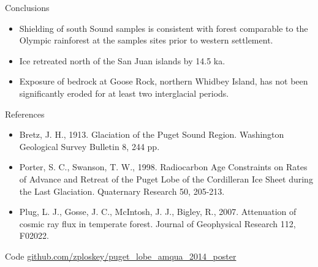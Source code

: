\documentclass{beamer}
\begin{document}
\begin{frame}{}
\begin{columns}[T]
\begin{column}{.32\columnwidth}
\begin{block}{Conclusions}
\begin{itemize}
\item Shielding of south Sound samples is consistent with forest comparable to the Olympic rainforest at the samples sites prior to western settlement.
\item Ice retreated north of the San Juan islands by 14.5 ka.
\item Exposure of bedrock at Goose Rock, northern Whidbey Island, has not been significantly eroded for at least two interglacial periods.
\end{itemize}
\end{block}

\begin{block}{References} 
{\small

\begin{itemize}


\item Bretz, J. H., 1913. Glaciation of the Puget Sound Region. Washington Geological Survey Bulletin 8, 244 pp.

\item Porter, S. C., Swanson, T. W., 1998. Radiocarbon Age Constraints on Rates of Advance and Retreat of the Puget Lobe of the Cordilleran Ice Sheet during the Last Glaciation. Quaternary Research 50, 205-213.

\item Plug, L. J., Gosse, J. C., McIntosh, J. J., Bigley, R., 2007. Attenuation of cosmic ray flux in temperate forest. Journal of Geophysical Research 112, F02022.

\end{itemize}

} %
\end{block}

\begin{block}{Code}
	\center \url{github.com/zploskey/puget_lobe_amqua_2014_poster} 
	
\end{block}

\end{column}

\end{columns}

\end{frame}
\end{document}
